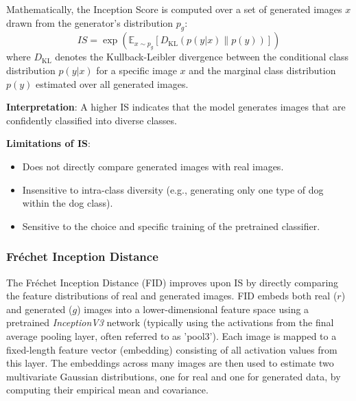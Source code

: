 \noindent
Mathematically, the Inception Score is computed over a set of generated images \(x\) drawn from the generator's distribution \(p_g\):
\begin{equation}
IS = \exp \left( \mathbb{E}_{x \sim p_g} \left[ D_{\text{KL}}(p(y|x) \| p(y)) \right] \right)
\end{equation}
where \( D_{\text{KL}} \) denotes the Kullback-Leibler divergence between the conditional class distribution \(p(y|x)\) for a specific image \(x\) and the marginal class distribution \(p(y)\) estimated over all generated images.

\noindent\textbf{Interpretation}:
A higher IS indicates that the model generates images that are confidently classified into diverse classes.

\noindent\textbf{Limitations of IS}:
\begin{itemize}
    \item Does not directly compare generated images with real images.
    \item Insensitive to intra-class diversity (e.g., generating only one type of dog within the dog class).
    \item Sensitive to the choice and specific training of the pretrained classifier.
\end{itemize}

\subsubsection[Fréchet Inception Distance - FID]{Fréchet Inception Distance}

The Fréchet Inception Distance (FID) \cite{heusel2018ganstrainedtimescaleupdate} improves upon IS by directly comparing the feature distributions of real and generated images. FID embeds both real (\(r\)) and generated (\(g\)) images into a lower-dimensional feature space using a pretrained \textit{InceptionV3} network (typically using the activations from the final average pooling layer, often referred to as 'pool3'). Each image is mapped to a fixed-length feature vector (embedding) consisting of all activation values from this layer. The embeddings across many images are then used to estimate two multivariate Gaussian distributions, one for real and one for generated data, by computing their empirical mean and covariance.


